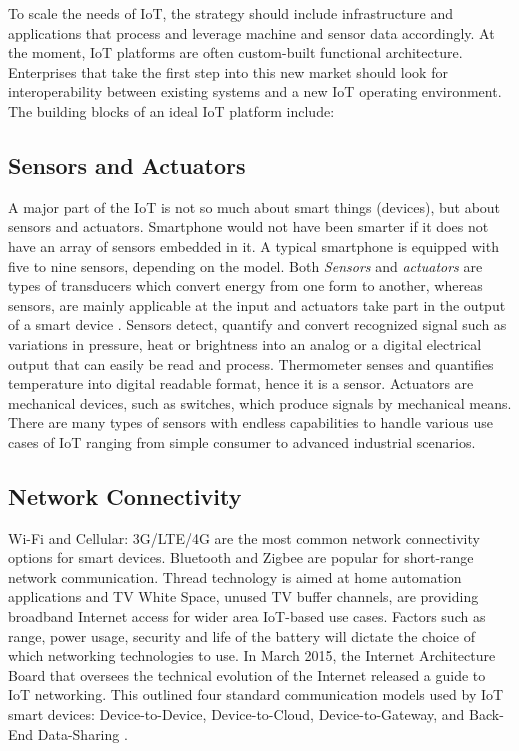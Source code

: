 \documentclass[sigconf]{acmart}
\begin{document}
	To scale the needs of IoT, the strategy should include infrastructure and applications that process and leverage machine and sensor data accordingly. At the moment, IoT platforms are often custom-built functional architecture. Enterprises that take the first step into this new market should look for interoperability between existing systems and a new IoT operating environment. The building blocks of an ideal IoT platform include:
	
	\subsection{Sensors and Actuators}
	A major part of the IoT is not so much about smart things (devices), but about sensors and actuators. Smartphone would not have been smarter if it does not have an array of sensors embedded in it. A typical smartphone is equipped with five to nine sensors, depending on the model. Both {\em Sensors} and  {\em actuators} are types of transducers which convert energy from one form to another, whereas sensors, are mainly applicable at the input and actuators take part in the output of a smart device \cite{wiley-book}. Sensors detect, quantify and convert recognized signal such as variations in pressure, heat or brightness into an analog or a digital electrical output that can easily be read and process. Thermometer senses and quantifies temperature into digital readable format, hence it is a sensor. Actuators are mechanical devices, such as switches, which produce signals by mechanical means. There are many types of sensors with endless capabilities to handle various use cases of IoT ranging from 
	simple consumer to advanced industrial scenarios.	
	
	
	\subsection{Network Connectivity}
	Wi-Fi and Cellular: 3G/LTE/4G are the most common network connectivity options for smart devices. Bluetooth and Zigbee are popular for short-range network communication. Thread technology is aimed at home automation applications and TV White Space, unused TV buffer channels, are providing broadband Internet access for wider area IoT-based use cases. Factors such as range, power usage, security and life of the battery will dictate the choice of which networking technologies to use. In March 2015, the Internet Architecture Board that oversees the technical evolution of the Internet released a guide to IoT networking. This outlined four standard communication models used by IoT smart devices: Device-to-Device, Device-to-Cloud, Device-to-Gateway, and Back-End Data-Sharing \cite{internet-society}.
	
\end{document}
